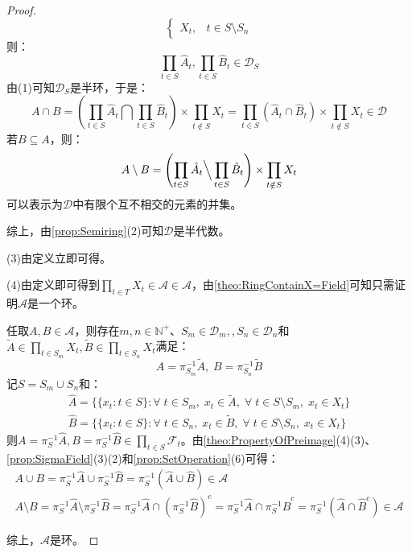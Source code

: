 \begin{proof}
\begin{equation*}
\begin{cases}
			X_t,&t\in S\setminus S_n
		\end{cases}
	\end{equation*}
	则：
	\begin{equation*}
		\prod_{t\in S}\hat{A}_t,\prod_{t\in S}\hat{B}_t\in\mathscr{D}_S
	\end{equation*}
	由(1)可知$\mathscr{D}_S$是半环，于是：
	\begin{equation*}
		A\cap B=\left(\prod_{t\in S}\hat{A}_t\bigcap\prod_{t\in S}\hat{B}_t\right)\times\prod_{t\notin S}X_t=\prod_{t\in S}(\hat{A}_t\cap\hat{B}_t)\times\prod_{t\notin S}X_t\in\mathscr{D}
	\end{equation*}
	若$B\subseteq A$，则：
	\begin{equation*}
		A\setminus B=\left(\prod_{t\in S}\hat{A}_t\Big\backslash\prod_{t\in S}\hat{B}_t\right)\times\prod_{t\notin S}X_t
	\end{equation*}
	可以表示为$\mathscr{D}$中有限个互不相交的元素的并集。\par
	综上，由\cref{prop:Semiring}(2)可知$\mathscr{D}$是半代数。\par
	(3)由定义立即可得。\par
	(4)由定义即可得到$\prod\limits_{t\in T}X_t\in\mathscr{A}\in\mathscr{A}$，由\cref{theo:RingContainX=Field}可知只需证明$\mathscr{A}$是一个环。\par
	任取$A,B\in\mathscr{A}$，则存在$m,n\in\mathbb{N}^+$、$S_m\in \mathcal{D}_m,,S_n\in\mathcal{D}_n$和$\tilde{A}\in\prod\limits_{t\in S_m}X_t,\tilde{B}\in\prod\limits_{t\in S_n}X_t$满足：
	\begin{equation*}
		A=\pi_{S_m}^{-1}\tilde{A},\;B=\pi_{S_n}^{-1}\tilde{B}
	\end{equation*}
	记$S=S_m\cup S_n$和：
	\begin{gather*}
		\hat{A}=\Big\{\{x_t:t\in S\}:\forall\;t\in S_m,\;x_t\in\tilde{A},\;\forall\;t\in S\setminus S_m,\;x_t\in X_t\Big\} \\
		\hat{B}=\Big\{\{x_t:t\in S\}:\forall\;t\in S_n,\;x_t\in\tilde{B},\;\forall\;t\in S\setminus S_n,\;x_t\in X_t\Big\}
	\end{gather*}
	则$A=\pi_{S}^{-1}\hat{A},B=\pi_{S}^{-1}\hat{B}\in\prod\limits_{t\in S}\mathscr{F}_t$。由\cref{theo:PropertyOfPreimage}(4)(3)、\cref{prop:SigmaField}(3)(2)和\cref{prop:SetOperation}(6)可得：
	\begin{gather*}
		A\cup B=\pi_{S}^{-1}\hat{A}\cup\pi_{S}^{-1}\hat{B}=\pi_{S}^{-1}(\hat{A}\cup\hat{B})\in\mathscr{A} \\
		A\setminus B=\pi_{S}^{-1}\hat{A}\setminus\pi_{S}^{-1}\hat{B}=\pi_{S}^{-1}\hat{A}\cap(\pi_{S}^{-1}\hat{B})^c=\pi_{S}^{-1}\hat{A}\cap\pi_{S}^{-1}\hat{B}^c=\pi_{S}^{-1}(\hat{A}\cap\hat{B}^c)\in\mathscr{A}
	\end{gather*}\par
	综上，$\mathscr{A}$是环。
\end{proof}

